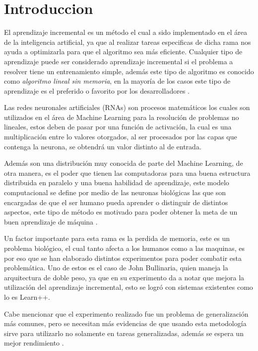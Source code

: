 \section{Introduccion}

El aprendizaje incremental es un método el cual a sido implementado en el área de la inteligencia artificial, ya que al realizar tareas especificas de dicha rama nos 
ayuda a optimizarla para que el algoritmo sea más eficiente.
Cualquier tipo de aprendizaje puede ser considerado aprendizaje incremental si el problema a resolver tiene un entrenamiento simple, además este tipo de algoritmo es conocido como \textit{algoritmo lineal sin memoria},
en la mayor\'ia de los casos este tipo de aprendizaje es el preferido o favorito por los desarrolladores \cite{GiraudCarrier2000}.

Las redes neuronales artificiales (RNAs) son procesos matem\'aticos los cuales son utilizados en el \'area de Machine Learning para 
la resoluci\'on de problemas no lineales, estos deben de pasar por una funci\'on de activaci\'on, la cual es una multiplicaci\'on 
entre lo valores otorgados, al ser procesados por las capas que contenga la neurona, se obtendr\'a un valor distinto al de entrada.

Adem\'as son una distribuci\'on muy conocida de parte del Machine Learning, de otra manera, es el poder que tienen las computadoras para una buena estructura distribuida en paralelo y una buena habilidad de aprendizaje, 
este modelo computacional se define por medio de las neuronas biológicas las que son encargadas de que el ser humano pueda aprender o distinguir de distintos aspectos, este tipo de 
método es motivado para poder obtener la meta de un buen aprendizaje de m\'aquina \cite{liu2015}.

Un factor importante para esta rama es la perdida de memoria, este es un problema biol\'ogico, el cual tanto afecta a los humanos como a las maquinas, es por eso que se han elaborado distintos
experimentos para poder combatir esta problemática.
Uno de  estos es el caso de John Bullinaria, quien maneja la arquitectura de doble peso, ya que en su experimento da a notar que mejora la utilizaci\'on del aprendizaje incremental, esto se logr\'o 
con sistemas existentes como lo es Learn++.

Cabe mencionar que el experimento realizado fue un problema de generalizaci\'on m\'as comunes, pero se necesitan m\'as evidencias 
de que usando esta metodolog\'ia sirve para utilizarlo no solamente en tareas generalizadas, adem\'as se espera un mejor rendimiento \cite{Bullinaria2009}.  \\


